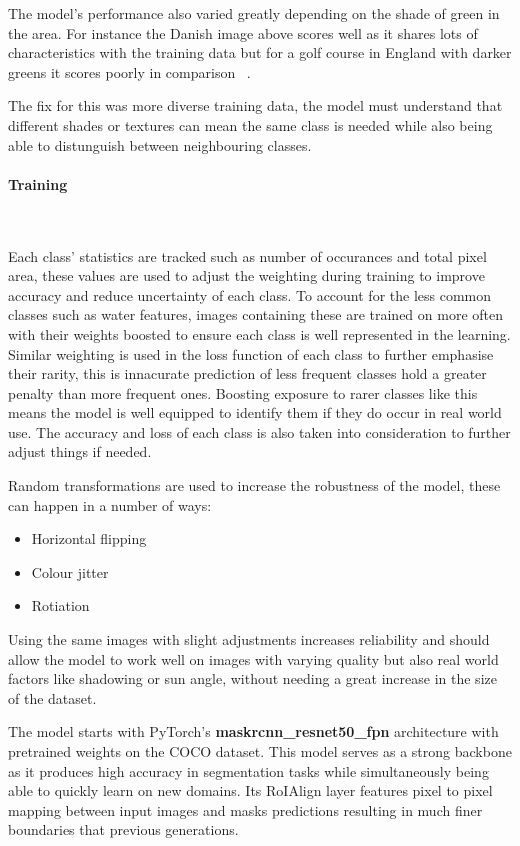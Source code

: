 \documentclass[final]{cmpreport_02}
\begin{document}
The model's performance also varied greatly depending on the shade of green in the area. For instance the Danish image above scores well as it shares lots of characteristics with the training data but for a golf course in England with darker greens it scores poorly in comparison ~.

The fix for this was more diverse training data, the model must understand that different shades or textures can mean the same class is needed while also being able to distunguish between neighbouring classes.

\paragraph{Training} \

Each class' statistics are tracked such as number of occurances and total pixel area, these values are used to adjust the weighting during training to improve accuracy and reduce uncertainty of each class.
To account for the less common classes such as water features, images containing these are trained on more often with their weights boosted to ensure each class is well represented in the learning.
Similar weighting is used in the loss function of each class to further emphasise their rarity, this is innacurate prediction of less frequent classes hold a greater penalty than more frequent ones.
Boosting exposure to rarer classes like this means the model is well equipped to identify them if they do occur in real world use.
The accuracy and loss of each class is also taken into consideration to further adjust things if needed.

Random transformations are used to increase the robustness of the model, these can happen in a number of ways:

\begin{itemize}
	\item{Horizontal flipping}
	\item{Colour jitter}
	\item{Rotiation}
\end{itemize}
Using the same images with slight adjustments increases reliability and should allow the model to work well on images with varying quality but also real world factors like shadowing or sun angle, without needing a great increase in the size of the dataset.

The model starts with PyTorch's \textbf{maskrcnn_resnet50_fpn} architecture with pretrained weights on the COCO \citep{coco} dataset.
This model serves as a strong backbone as it produces high accuracy in segmentation tasks while simultaneously being able to quickly learn on new domains.
Its RoIAlign layer features pixel to pixel mapping between input images and masks predictions resulting in much finer boundaries that previous generations.
\end{document}

